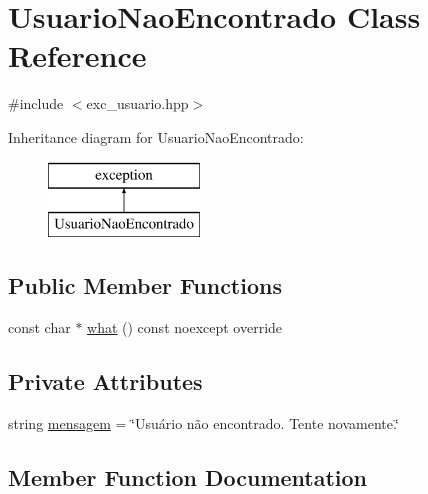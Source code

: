 \hypertarget{classUsuarioNaoEncontrado}{}\section{Usuario\+Nao\+Encontrado Class Reference}
\label{classUsuarioNaoEncontrado}


{\ttfamily \#include $<$exc\+\_\+usuario.\+hpp$>$}

Inheritance diagram for Usuario\+Nao\+Encontrado\+:\begin{figure}[H]
\begin{center}
\leavevmode
\includegraphics[height=2.000000cm]{classUsuarioNaoEncontrado}
\end{center}
\end{figure}
\subsection*{Public Member Functions}
\begin{DoxyCompactItemize}
\item 
const char $\ast$ \hyperlink{classUsuarioNaoEncontrado_a81dbc44d187226187e1fe4b81e6e816d}{what} () const noexcept override
\end{DoxyCompactItemize}
\subsection*{Private Attributes}
\begin{DoxyCompactItemize}
\item 
string \hyperlink{classUsuarioNaoEncontrado_abad07fdf50cec90997957a8282d29be4}{mensagem} = \char`\"{}Usuário não encontrado. Tente novamente.\char`\"{}
\end{DoxyCompactItemize}


\subsection{Member Function Documentation}
\mbox{\label{classUsuarioNaoEncontrado_a81dbc44d187226187e1fe4b81e6e816d}} 
